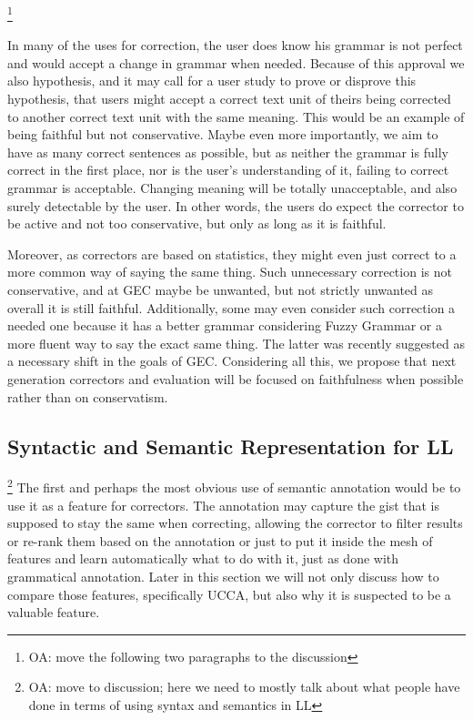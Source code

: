 \documentclass[english]{article}
\newcommand{\oa}[1]{\footnote{\color{red}OA: #1}}
\begin{document}
\oa{move the following two paragraphs to the discussion}
{\color{red} In many of the uses for correction,
the user does know his grammar is not perfect and would accept
a change in grammar when needed. Because of this approval we also
hypothesis, and it may call for a user study to prove or disprove
this hypothesis, that users might accept a correct text unit of theirs
being corrected to another correct text unit with the same meaning.
This would be an example of being faithful but not conservative.
Maybe even more importantly, we aim to have as many correct sentences
as possible, but as neither the grammar is fully correct in the first place,
nor is the user's understanding of it, failing to correct grammar
is acceptable. Changing meaning will be totally unacceptable, and
also surely detectable by the user. In other words, the users do expect
the corrector to be active and not too conservative, but
only as long as it is faithful. 

Moreover, as correctors are based on statistics, they might even
just correct to a more common way of saying the same thing. Such unnecessary
correction is not conservative, and at GEC maybe be unwanted, but not strictly unwanted as overall
it is still faithful. Additionally, some may even
consider such correction a needed one because it has a better grammar considering
Fuzzy Grammar\cite{lakoff1973fuzzy,madnani2011they} or a more fluent
way to say the exact same thing. The latter was recently suggested as a necessary
shift in the goals of GEC\cite{sakaguchi2016reassessing}.
Considering all this, we propose that next generation correctors and evaluation will be focused on faithfulness
when possible rather than on conservatism.
}


\subsection{Syntactic and Semantic Representation for LL}

\oa{move to discussion; here we need to mostly talk about what people have done in terms
  of using syntax and semantics in LL}
{\color{red}
The first and perhaps the most obvious use of semantic annotation
would be to use it as a feature for correctors. The annotation may
capture the gist that is supposed to stay the same when correcting,
allowing the corrector to filter results or re-rank them based on
the annotation or just to put it inside the mesh of features and learn
automatically what to do with it, just as done with grammatical annotation.
Later in this section we will not only discuss how to compare those
features, specifically UCCA, but also why it is suspected to be a
valuable feature.}
\end{document}
